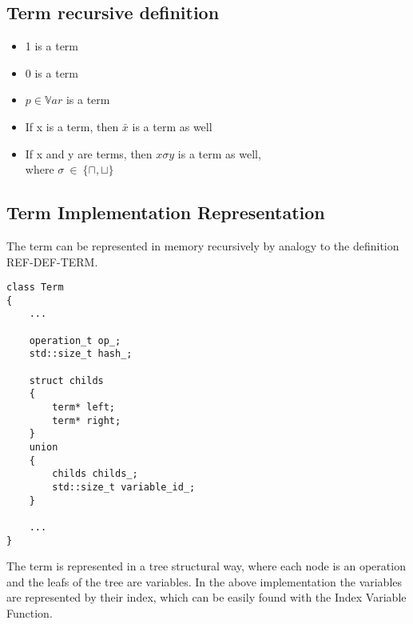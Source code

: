 \documentclass{article}
\begin{document}
		\subsection*{Term recursive definition}
		\begin{itemize}
			\item 1 is a term
			\item 0 is a term
			\item $p \in \mathbb{V}ar$ is a term
			\item If x is a term, then $\bar{x}$ is a term as well
			\item If x and y are terms, then $x \sigma y $ is a term as well,\\
				where $\sigma \: \in \: \{\sqcap, \sqcup\}$
		\end{itemize}	

		\subsection*{Term Implementation Representation}
			The term can be represented in memory recursively by analogy to the definition REF-DEF-TERM.

		\begin{lstlisting}
class Term 
{
	...

	operation_t op_;
	std::size_t hash_;
	
	struct childs
	{
		term* left;
		term* right;
	}
	union 
	{
		childs childs_;
		std::size_t variable_id_;
	}

	...
}
		\end{lstlisting}
		The term is represented in a tree structural way, where each node is an operation and the leafs of the tree
		are variables. In the above implementation the variables are represented by their index, which can be 
		easily found with the Index Variable Function.
\end{document}
